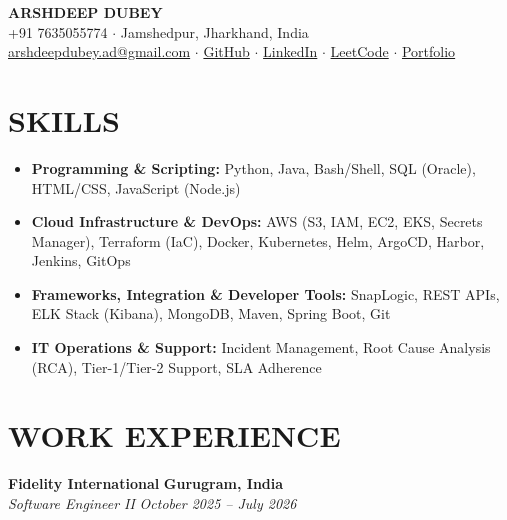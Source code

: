 \documentclass[10pt,a4paper]{article}
\begin{document}
\pagestyle{empty}

\begin{center}
    {\LARGE \bfseries \color{primary} ARSHDEEP DUBEY} \\[4pt]
    \small
    +91 7635055774 $\cdot$ Jamshedpur, Jharkhand, India \\[3pt]
    \href{mailto:arshdeepdubey.ad@gmail.com}{arshdeepdubey.ad@gmail.com} $\cdot$ \href{https://github.com/Arshdeepdubey}{GitHub} $\cdot$ 
    \href{https://www.linkedin.com/in/dubey-arshdeep}{LinkedIn} $\cdot$ \href{https://leetcode.com/u/zorojuro_conqueror/}{LeetCode} $\cdot$ \href{https://arshdeepdubey.github.io/Portfolio/}{Portfolio}
\end{center}

\vspace{-4pt}


\section*{SKILLS}

\small

\begin{itemize}

    \item \textbf{Programming \& Scripting:} Python, Java, Bash/Shell, SQL (Oracle), HTML/CSS, JavaScript (Node.js)

    \item \textbf{Cloud Infrastructure \& DevOps:} AWS (S3, IAM, EC2, EKS, Secrets Manager), Terraform (IaC), Docker, Kubernetes, Helm, ArgoCD, Harbor, Jenkins, GitOps

    \item \textbf{Frameworks, Integration \& Developer Tools:} SnapLogic, REST APIs, ELK Stack (Kibana), MongoDB, Maven, Spring Boot, Git

    \item \textbf{IT Operations \& Support:} Incident Management, Root Cause Analysis (RCA), Tier-1/Tier-2 Support, SLA Adherence

\end{itemize}



\section*{WORK EXPERIENCE}

\noindent \textbf{Fidelity International} \hfill \textbf{Gurugram, India} \\
\textit{Software Engineer II} \hfill \textit{October 2025 -- July 2026}
\end{document}

